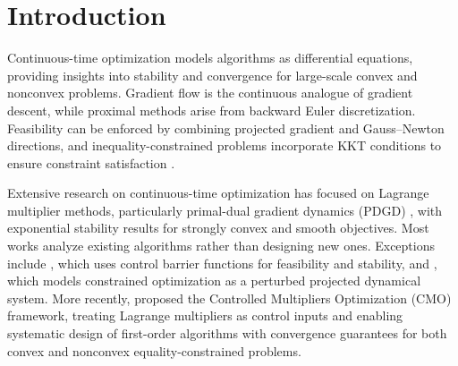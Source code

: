 \documentclass[letterpaper, 10 pt, conference]{ieeeconf}
\begin{document}
\section{Introduction}
Continuous-time optimization models algorithms as differential equations, providing insights into stability and convergence for large-scale convex and nonconvex problems. Gradient flow is the continuous analogue of gradient descent, while proximal methods arise from backward Euler discretization. Feasibility can be enforced by combining projected gradient and Gauss–Newton directions, and inequality-constrained problems incorporate KKT conditions to ensure constraint satisfaction \cite{schropp2000dynamical,zhou2007convergence}.

Extensive research on continuous-time optimization has focused on Lagrange multiplier methods, particularly primal-dual gradient dynamics (PDGD) \cite{arrow1958studies}, with exponential stability results for strongly convex and smooth objectives. Most works analyze existing algorithms rather than designing new ones. Exceptions include \cite{allibhoy2023control}, which uses control barrier functions for feasibility and stability, and \cite{feng2020dynamical}, which models constrained optimization as a perturbed projected dynamical system. More recently, \cite{cerone2025new} proposed the Controlled Multipliers Optimization (CMO) framework, treating Lagrange multipliers as control inputs and enabling systematic design of first-order algorithms with convergence guarantees for both convex and nonconvex equality-constrained problems.
\end{document}
